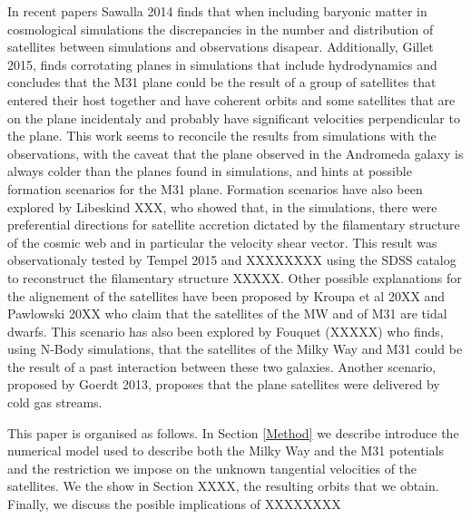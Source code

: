 \documentclass[useAMS,usenatbib]{mn2e}
\begin{document}
In recent papers Sawalla 2014 finds that when including baryonic matter in
cosmological simulations the discrepancies in the number and
distribution of satellites between simulations and
observations disapear. Additionally, Gillet 2015, finds corrotating
planes in simulations that include hydrodynamics and concludes that the M31
plane could be the result of a group of satellites that entered their
host together and have coherent orbits and some satellites that are on
the plane incidentaly and probably have significant velocities
perpendicular to the plane. This work seems to reconcile the results
from simulations with the observations, with the caveat that the plane observed in the 
Andromeda galaxy is always colder than the planes found in simulations, 
and hints at possible formation scenarios for the M31 plane.  
Formation scenarios have also been explored by Libeskind XXX, who
showed that, in the simulations, there were preferential directions
for satellite accretion dictated by the filamentary structure of the
cosmic web and in particular the velocity shear vector. This result
was observationaly tested by Tempel 2015 and XXXXXXXX using the SDSS
catalog to reconstruct the filamentary structure XXXXX.
Other possible explanations for the alignement of the satellites have
been proposed by Kroupa et al 20XX and Pawlowski 20XX who claim that
the satellites of the MW and of M31 are tidal dwarfs. This scenario
has also been explored by Fouquet (XXXXX) who finds, using N-Body
simulations, that the satellites of the Milky Way and M31 could be the
result of a past interaction between these two galaxies. Another
scenario, proposed by Goerdt 2013, proposes that the plane satellites
were delivered by cold gas streams.

This paper is organised as follows. 
In Section \ref{Method} we describe introduce the numerical model used to describe both the Milky Way and the M31 potentials and the restriction we impose on the unknown tangential velocities of the satellites. We the show in Section XXXX, the resulting orbits that we obtain. Finally, we discuss the posible implications of XXXXXXXX   
\end{document}
